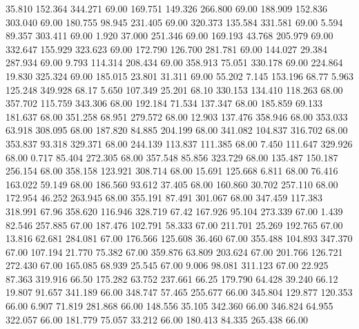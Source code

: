   35.810  152.364  344.271        69.00
 169.751  149.326  266.800        69.00
 188.909  152.836  303.040        69.00
 180.755   98.945  231.405        69.00
 320.373  135.584  331.581        69.00
   5.594   89.357  303.411        69.00
   1.920   37.000  251.346        69.00
 169.193   43.768  205.979        69.00
 332.647  155.929  323.623        69.00
 172.790  126.700  281.781        69.00
 144.027   29.384  287.934        69.00
   9.793  114.314  208.434        69.00
 358.913   75.051  330.178        69.00
 224.864   19.830  325.324        69.00
 185.015   23.801   31.311        69.00
  55.202    7.145  153.196        68.77
   5.963  125.248  349.928        68.17
   5.650  107.349   25.201        68.10
 330.153  134.410  118.263        68.00
 357.702  115.759  343.306        68.00
 192.184   71.534  137.347        68.00
 185.859   69.133  181.637        68.00
 351.258   68.951  279.572        68.00
  12.903  137.476  358.946        68.00
 353.033   63.918  308.095        68.00
 187.820   84.885  204.199        68.00
 341.082  104.837  316.702        68.00
 353.837   93.318  329.371        68.00
 244.139  113.837  111.385        68.00
   7.450  111.647  329.926        68.00
   0.717   85.404  272.305        68.00
 357.548   85.856  323.729        68.00
 135.487  150.187  256.154        68.00
 358.158  123.921  308.714        68.00
  15.691  125.668    6.811        68.00
  76.416  163.022   59.149        68.00
 186.560   93.612   37.405        68.00
 160.860   30.702  257.110        68.00
 172.954   46.252  263.945        68.00
 355.191   87.491  301.067        68.00
 347.459  117.383  318.991        67.96
 358.620  116.946  328.719        67.42
 167.926   95.104  273.339        67.00
   1.439   82.546  257.885        67.00
 187.476  102.791   58.333        67.00
 211.701   25.269  192.765        67.00
  13.816   62.681  284.081        67.00
 176.566  125.608   36.460        67.00
 355.488  104.893  347.370        67.00
 107.194   21.770   75.382        67.00
 359.876   63.809  203.624        67.00
 201.766  126.721  272.430        67.00
 165.085   68.939   25.545        67.00
   9.006   98.081  311.123        67.00
  22.925   87.363  319.916        66.50
 175.282   63.752  237.661        66.25
 179.790   64.428   39.240        66.12
  19.807   91.657  341.189        66.00
 348.747   57.465  255.677        66.00
 345.804  129.877  120.353        66.00
   6.907   71.819  281.868        66.00
 148.556   35.105  342.360        66.00
 346.824   64.955  322.057        66.00
 181.779   75.057   33.212        66.00
 180.413   84.335  265.438        66.00
